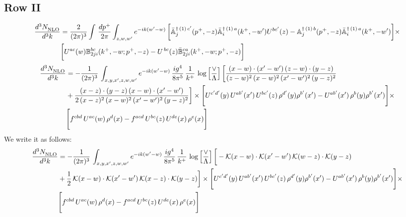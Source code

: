 \documentclass[9pt]{article}
\def\mf#1{\mathbb{#1}}
\numberwithin{equation}{section}
\begin{document}
\subsection{Row II}
\begin{align}
    \frac{d^{3}N_{\rm NLO}^{\rm}}{d^{3}k}  & =    \frac{2}{(2\pi)^{3}} \int\, \frac{dp^{+}}{2\pi}\int_{z,w,w^{\prime}} e^{-ik(w^{\prime}-w)}\,\bigg[\Bar{\mf{A}}^{\dagger\,(1)\, c^{\prime}}_{j}(p^{+},-z)\Bar{\mf{A}}^{\dagger\, (1)\, a}_{i}(k^{+},- w^{\prime})U^{bc^{\prime}}(z) - \mf{A}^{\dagger\, (1)\, b}_{j}(p^{+},- z)\Bar{\mf{A}}^{\dagger\, (1)\, a}_{i}(k^{+},- w^{\prime})\bigg] \times \notag \\ & \bigg[U^{ac}(w) \mf{B}^{bc}_{2ji}(k^{+},-w;p^{+},-z) -U^{\, bc}(z)\Bar{\mf{B}}^{ca}_{2ji}(k^{+},-w; p^{+},-z)\bigg] \nonumber
\end{align}
\begin{align}
 \frac{d^{3}N_{\rm NLO}^{\rm}}{d^{3}k}  & =    -\frac{1}{(2\pi)^{3}}\, \int_{x,y,x',z,w,w^{\prime}} e^{-ik(w^{\prime}-w)}\,\frac{ig^{4}}{8\pi^{5}}\,\frac{1}{k^{+}}\,\log{\left[\frac{\vee}{\Lambda}\right]} \,\bigg[\frac{(x-w)\cdot (x'-w')\,(z-w)\cdot (y-z)}{(z-w)^{2}\,(x-w)^{2}\,(x'-w')^{2}\,(y-z)^{2}}\notag \\ & +\frac{(x-z)\cdot (y-z)\,(x-w)\cdot (x'-w')}{2\,(x-z)^{2}\, (x-w)^{2}\,(x'-w')^{2}\,(y-z)^{2}}\bigg]\times\Bigg[U^{c'd'}(y)\,U^{ab'}(x')\,U^{bc'}(z)\,\rho^{d'}(y)\rho^{b'}(x')-U^{ab'}(x')\,\rho^{b}(y)\rho^{b'}(x')\Bigg]\times\notag \\ & \Bigg[f^{cbd}\,U^{ac}(w)\,\rho^{d}(x)-f^{acd}\, U^{bc}(z)\,U^{de}(x)\,\rho^{e}(x)\Bigg]
\end{align}
We write it as follows:
\begin{align}
 \frac{d^{3}N_{\rm NLO}^{\rm}}{d^{3}k}  & =    -\frac{1}{(2\pi)^{3}}\, \int_{x,y,x',z,w,w^{\prime}} e^{-ik(w^{\prime}-w)}\,\frac{ig^{4}}{8\pi^{5}}\,\frac{1}{k^{+}}\,\log{\left[\frac{\vee}{\Lambda}\right]} \,\bigg[-\mathcal{K}(x-w)\cdot \mathcal{K}(x'-w')\, \mathcal{K}(w-z)\cdot \mathcal{K}(y-z)\notag \\ & +\frac{1}{2}\,\mathcal{K}(x-w)\cdot \mathcal{K}(x'-w')\, \mathcal{K}(x-z)\cdot \mathcal{K}(y-z)\bigg]\times\Bigg[U^{c'd'}(y)\,U^{ab'}(x')\,U^{bc'}(z)\,\rho^{d'}(y)\rho^{b'}(x')-U^{ab'}(x')\,\rho^{b}(y)\rho^{b'}(x')\Bigg]\times\notag \\ & \Bigg[f^{cbd}\,U^{ac}(w)\,\rho^{d}(x)-f^{acd}\, U^{bc}(z)\,U^{de}(x)\,\rho^{e}(x)\Bigg]
\end{align}
\end{document}
